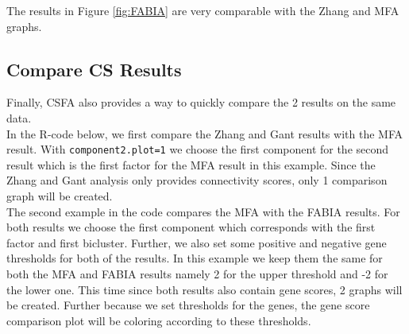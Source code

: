 \documentclass[a4paper]{article}\usepackage[]{graphicx}\usepackage[]{color}
\begin{document}
\noindent The results in Figure \ref{fig:FABIA} are very comparable with the
Zhang and MFA graphs.

\subsection{Compare CS Results}
Finally, CSFA also provides a way to quickly compare the 2 results on the same
data.\\
In the R-code below, we first compare the Zhang and Gant results with the MFA
result. With \texttt{component2.plot=1} we choose the first component for the
second result which is the first factor for the MFA result in this example.
Since the Zhang and Gant analysis only provides connectivity scores, only 1
comparison graph will be created.\\
The second example in the code compares the MFA with the FABIA results. For both
results we choose the first component which corresponds with the first factor
and first bicluster. Further, we also set some positive and negative gene
thresholds for both of the results. In this example we keep them the same for
both the MFA and FABIA results namely 2 for the upper threshold and -2 for the
lower one. This time since both results also contain gene scores, 2 graphs will
be created. Further because we set thresholds for the genes, the gene score
comparison plot will be coloring according to these thresholds.
\end{document}
